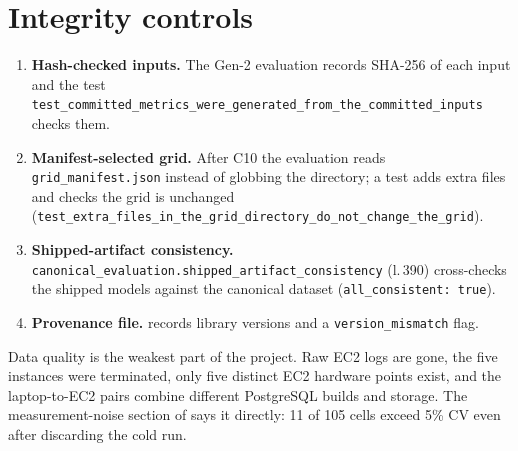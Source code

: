 \section{Integrity controls}
\begin{enumerate}
\item \textbf{Hash-checked inputs.} The Gen-2 evaluation records SHA-256 of each input and the test
  \texttt{test\_committed\_metrics\_were\_generated\_from\_the\_committed\_inputs} checks them.
\item \textbf{Manifest-selected grid.} After C10 the evaluation reads \texttt{grid\_manifest.json} instead of globbing the directory; a test adds extra files and
  checks the grid is unchanged (\texttt{test\_extra\_files\_in\_the\_grid\_directory\_do\_not\_change\_the\_grid}).
\item \textbf{Shipped-artifact consistency.} \texttt{canonical\_evaluation.shipped\_artifact\_consistency} (l.\,390) cross-checks the shipped models against the
  canonical dataset (\texttt{all\_consistent: true}).
\item \textbf{Provenance file.}  records library versions and a \texttt{version\_mismatch} flag.
\end{enumerate}
\begin{honest}
Data quality is the weakest part of the project. Raw EC2 logs are gone, the five instances were terminated, only five distinct EC2 hardware points exist, and the laptop-to-EC2
pairs combine different PostgreSQL builds and storage. The measurement-noise section of  says it directly: 11 of 105 cells exceed 5\% CV even after discarding the cold run.
\end{honest}
